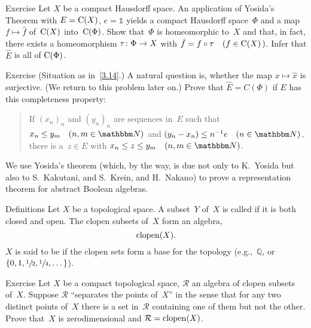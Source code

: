 \documentclass[main.tex]{subfiles}
\begin{document}
%
%
\begin{psec}{3.15}{Exercise}
Let $X$ be a compact Hausdorff space.
An application of Yosida's Theorem with $E=\mathrm{C}(X)$,
$e=\mathbb{1}$ yields
a compact Hausdorff space~$\Phi$
and a map $f\mapsto\hat{f}$ of~$\mathrm{C}(X)$ into~$\mathrm{C}(\Phi)$.
Show that~$\Phi$ is homeomorphic to~$X$
and that, in fact, there exists a homeomorphism
$\tau\colon \Phi\rightarrow X$ with $\hat{f}=f\circ \tau\quad(f\in \mathrm{C}(X)\, )$.
Infer that $\hat{E}$ is all of $\mathrm{C}(\Phi)$.
\end{psec}
%
%
\begin{psec}{3.16}{Exercise}
(Situation as in~\ref{3.14}.)
A natural question is,
whether the map $x\mapsto \hat{x}$ is surjective.
(We return to this problem later on.)
Prove that $\hat{E}=C(\Phi)$ if $E$ has this completeness property:
\begin{quote}
If $(x_n)_n$ and $(y_n)_n$ are sequences in~$E$
such that $x_n \leq y_m\quad (n,m\in \N)$
and $(y_n-x_n)\leq n^{-1} e\quad (n\in \N)$,
there is a~$z\in E$ with $x_n\leq z\leq y_m \quad (n,m\in \N)$.
\end{quote}
\end{psec}
%
%
We use Yosida's theorem
(which, by the way, 
is due not only to 
K.~Yosida
but also to 
S.~Kakutani,
and S.~Krein,
and H.~Nakano)
to prove a representation theorem
for abstract Boolean algebras.
\begin{psec}{3.17}{Definitions}
Let $X$ be a topological space.
A subset~$Y$ of~$X$
is called  if it is both closed and open.
The clopen subsets of~$X$ form an algebra,
\begin{equation*}
\mathrm{clopen}(X)\text{.}
\end{equation*}
$X$ is said to be 
if the clopen sets form a base 
for the topology (e.g.,~$\mathbb{Q}$, 
or $\{0,1,\sfrac{1}{2},\sfrac{1}{4},\dotsc\}$).
\end{psec}
%
%
\begin{psec}{3.18}{Exercise}
Let $X$ be a compact topological space,
$\mathcal{R}$ an algebra of clopen subsets of~$X$.
Suppose $\mathcal{R}$ ``separates the points of~$X$''
in the sense that for any two distinct points of~$X$
there is a set in~$\mathcal{R}$
containing one of them but not the other.
Prove that~$X$ is zerodimensional
and $\mathcal{R}=\mathrm{clopen}(X)$.
\end{psec}
%
%
\end{document}
